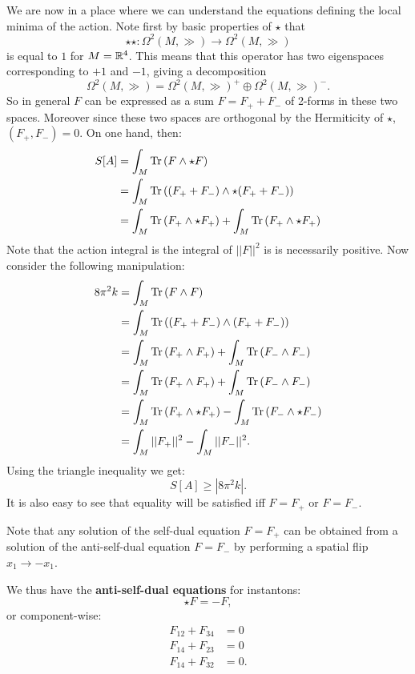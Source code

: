 	We are now in a place where we can understand the equations defining the local minima of the action. Note first by basic properties of $\star$ that
	\begin{equation}
		\star \star: \Omega^2(M, \gg) \to \Omega^2(M, \gg)
	\end{equation}
	is equal to $1$ for $M = \mathbb{R}^4$. This means that this operator has two eigenspaces corresponding to $+1$ and $-1$, giving a decomposition
	\begin{equation}
		\Omega^2(M, \gg) = \Omega^2(M, \gg)^+ \oplus \Omega^2(M, \gg)^-.
	\end{equation}
	So in general $F$ can be expressed as a sum $F = F_+ + F_-$ of 2-forms in these two spaces. Moreover since these two spaces are orthogonal by the Hermiticity of $\star$, $(F_+, F_-) = 0$. On one hand, then:
	\[
	\begin{aligned}
		S[A] &= \int_M \mathrm{Tr}\,(F \wedge \star F)\\
			 &= \int_M \mathrm{Tr}\,((F_+ + F_-) \wedge \star(F_+ + F_-))\\
			 &= \int_M \mathrm{Tr}\,(F_+ \wedge \star F_+) + \int_M \mathrm{Tr}\,(F_+ \wedge \star F_+)\\
	\end{aligned}
	\]
	Note that the action integral is the integral of $||F||^2$ is is necessarily positive. Now consider the following manipulation:
	\[
	\begin{aligned}
		8\pi^2 k &= \int_M \mathrm{Tr}\,(F \wedge F) \\
		  &= \int_M \mathrm{Tr}\,((F_+ + F_-)\wedge (F_+ + F_-)) \\
		  &= \int_M \mathrm{Tr}\,(F_+ \wedge F_+) + \int_M \mathrm{Tr}\,(F_- \wedge F_-) \\
		  &= \int_M \mathrm{Tr}\,(F_+ \wedge F_+) + \int_M \mathrm{Tr}\,(F_- \wedge F_-) \\
		  &= \int_M \mathrm{Tr}\,(F_+ \wedge \star F_+) - \int_M \mathrm{Tr}\,(F_- \wedge \star F_-)\\
		  &= \int_M ||F_+||^2 - \int_M ||F_-||^2.
	\end{aligned}
	\]
	Using the triangle inequality we get:
	\begin{equation}
		S[A] \geq |8 \pi^2 k|.
	\end{equation}
	It is also easy to see that equality will be satisfied iff $F = F_+$ or $F=F_-$.
	
	Note that any solution of the self-dual equation $F=F_+$ can be obtained from a solution of the anti-self-dual equation $F=F_-$ by performing a spatial flip $x_1 \to - x_1$.
	
	We thus have the \textbf{anti-self-dual equations} for instantons:
	\begin{equation}\label{eq:asd1}
		\star F = - F,
	\end{equation}
	or component-wise:
	\begin{equation}
		\begin{aligned}
			F_{12} + F_{34} &= 0\\
			F_{14} + F_{23} &= 0\\
			F_{14} + F_{32} &= 0.
		\end{aligned}
	\end{equation}
	

